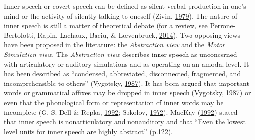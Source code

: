 \documentclass[a4paper,12pt,twoside,openright,oldfontcommands]{memoir}
\begin{document}
Inner speech or covert speech can be defined as silent verbal production
in one's mind or the activity of silently talking to oneself (Zivin,
\protect\hyperlink{ref-zivin_development_1979}{1979}). The nature of
inner speech is still a matter of theoretical debate (for a review, see
Perrone-Bertolotti, Rapin, Lachaux, Baciu, \& Lœvenbruck,
\protect\hyperlink{ref-Perrone-Bertolotti2014}{2014}). Two opposing
views have been proposed in the literature: the \emph{Abstraction view}
and the \emph{Motor Simulation view}. The \emph{Abstraction view}
describes inner speech as unconcerned with articulatory or auditory
simulations and as operating on an amodal level. It has been described
as ``condensed, abbreviated, disconnected, fragmented, and
incomprehensible to others'' (Vygotsky,
\protect\hyperlink{ref-vygotsky_collected_1987}{1987}). It has been
argued that important words or grammatical affixes may be dropped in
inner speech (Vygotsky,
\protect\hyperlink{ref-vygotsky_collected_1987}{1987}) or even that the
phonological form or representation of inner words may be incomplete (G.
S. Dell \& Repka, \protect\hyperlink{ref-dell_errors_1992}{1992};
Sokolov, \protect\hyperlink{ref-sokolov_inner_1972}{1972}). MacKay
(\protect\hyperlink{ref-mackay_constraints_1992}{1992}) stated that
inner speech is nonarticulatory and nonauditory and that ``Even the
lowest level units for inner speech are highly abstract'' (p.122).
\end{document}
